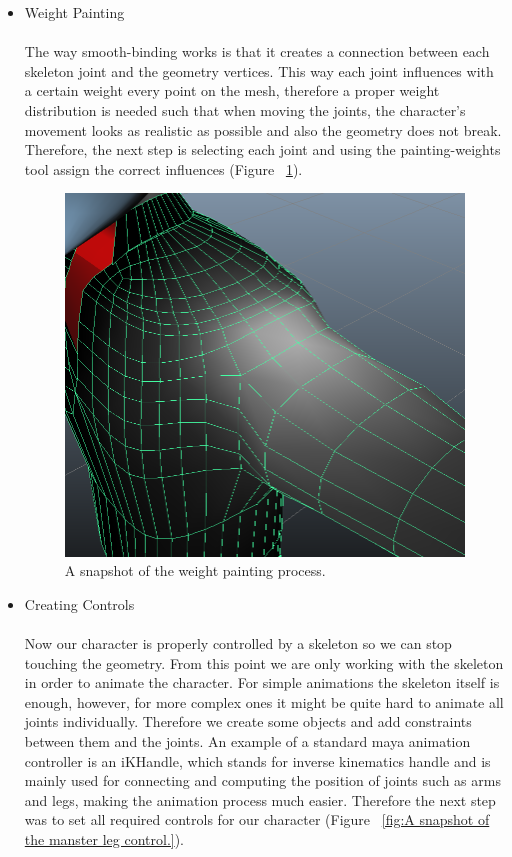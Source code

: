 \documentclass[a4paper,oneside]{memoir}
\begin{document}
\begin{itemize}
                    \item Weight Painting \\\\
                    	The way smooth-binding works is that it creates a connection between each skeleton joint and the geometry vertices. This way each joint influences with a certain weight every point on the mesh, therefore a proper weight distribution is needed such that when moving the joints, the character's movement looks as realistic as possible and also the geometry does not break. Therefore, the next step is selecting each joint and using the painting-weights tool assign the correct influences (Figure ~\ref{fig:A snapshot of the weight painting process.}).

                   \begin{figure}[ht]
						\begin{center}
							\includegraphics[width=120mm]{"../Screenshots/Maya/paintweight"}
							\caption{A snapshot of the weight painting process.}
							\label{fig:A snapshot of the weight painting process.}
						\end{center}
					\end{figure}

                    \item Creating Controls\\\\
                    	Now our character is properly controlled by a skeleton so we can stop touching the geometry. From this point we are only working with the skeleton in order to animate the character. For simple animations the skeleton itself is enough, however, for more complex ones it might be quite hard to animate all joints individually. Therefore we create some objects and add constraints between them and the joints. An example of a standard maya animation controller is an iKHandle, which stands for inverse kinematics handle and is mainly used for connecting and computing the position of joints such as arms and legs, making the animation process much easier. Therefore the next step was to set all required controls for our character (Figure ~\ref{fig:A snapshot of the manster leg control.}). 


\end{itemize}
\end{document}
